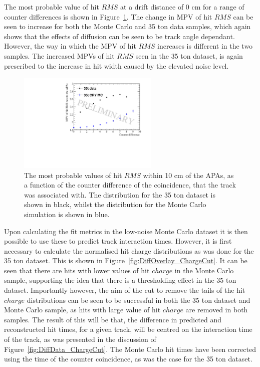 The most probable value of hit $RMS$ at a drift distance of 0 cm for a range of counter differences is shown in Figure~\ref{fig:DiffMCDataCompInt}. The change in MPV of hit $RMS$ can be seen to increase for both the Monte Carlo and 35 ton data samples, which again shows that the effects of diffusion can be seen to be track angle dependant. However, the way in which the MPV of hit $RMS$ increases is different in the two samples. The increased MPVs of hit $RMS$ seen in the 35 ton dataset, is again prescribed to the increase in hit width caused by the elevated noise level. \\

\begin{figure}
  \centering
  \includegraphics[width=0.6\textwidth]{InterceptCanvasOverlay}
  \caption[The angular dependence of diffusion in the 35 ton dataset and Monte Carlo for hits within 10 cm of the APAs]
          {The most probable values of hit $RMS$ within 10 cm of the APAs, as a function of the counter difference of the coincidence, that the track was associated with. The distribution for the 35 ton dataset is shown in black, whilst the distribution for the Monte Carlo simulation is shown in blue.}
  \label{fig:DiffMCDataCompInt}
\end{figure}

Upon calculating the fit metrics in the low-noise Monte Carlo dataset it is then possible to use these to predict track interaction times. However, it is first necessary to calculate the normalised hit charge distributions as was done for the 35 ton dataset. This is shown in Figure~\ref{fig:DiffOverlay_ChargeCut}. It can be seen that there are hits with lower values of hit $charge$ in the Monte Carlo sample, supporting the idea that there is a thresholding effect in the 35 ton dataset. Importantly however, the aim of the cut to remove the tails of the hit $charge$ distributions can be seen to be successful in both the 35 ton dataset and Monte Carlo sample, as hits with large value of hit $charge$ are removed in both samples. The result of this will be that, the difference in predicted and reconstructed hit times, for a given track, will be centred on the interaction time of the track, as was presented in the discussion of Figure~\ref{fig:DiffData_ChargeCut}. The Monte Carlo hit times have been corrected using the time of the counter coincidence, as was the case for the 35 ton dataset. \\ 

